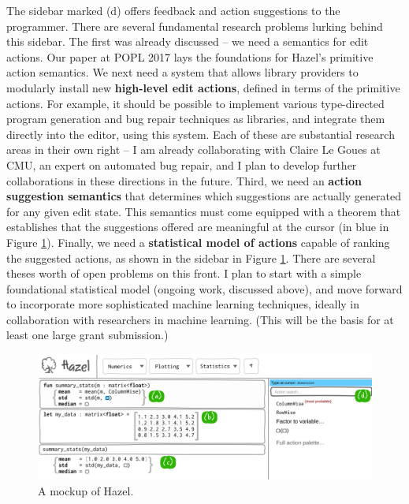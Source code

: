 \documentclass[9pt]{extarticle}
\begin{document}
The sidebar marked (d) offers feedback and action suggestions to the programmer. There are several fundamental research problems lurking behind this sidebar. The first was already discussed -- we need a semantics for edit actions. Our paper at POPL 2017 lays the foundations for Hazel's primitive action semantics. We next need a system that allows library providers to modularly install new \textbf{high-level edit actions}, defined in terms of the primitive actions. For example, it should be possible to implement various type-directed program generation and bug repair techniques as libraries, and integrate them directly into the editor, using this system. Each of these are substantial research areas in their own right -- I am already collaborating with Claire Le Goues at CMU, an expert on automated bug repair, and I plan to develop further collaborations in these directions in the future. Third, we need an \textbf{action suggestion semantics} that determines which suggestions are actually generated for any given edit state. This semantics must come equipped with a theorem that establishes that the suggestions offered are meaningful at the cursor (in blue in Figure \ref{fig:hazel-mockup}).  Finally, we need a \textbf{statistical model of actions} capable of ranking the suggested actions, as shown in the sidebar in Figure \ref{fig:hazel-mockup}. There are several theses worth of open problems on this front. I plan to start with a simple foundational statistical model (ongoing work, discussed above), and move forward to incorporate more sophisticated machine learning techniques, ideally in collaboration with researchers in machine learning. (This will be the basis for at least one large grant submission.)

\begin{figure}
\vspace{-2ex}
\centering
\includegraphics[width=\textwidth]{mockup-1}
\vspace{-4.5ex}
\caption{A mockup of Hazel.}
\label{fig:hazel-mockup}
\vspace{-2ex}
\end{figure}
\end{document}
